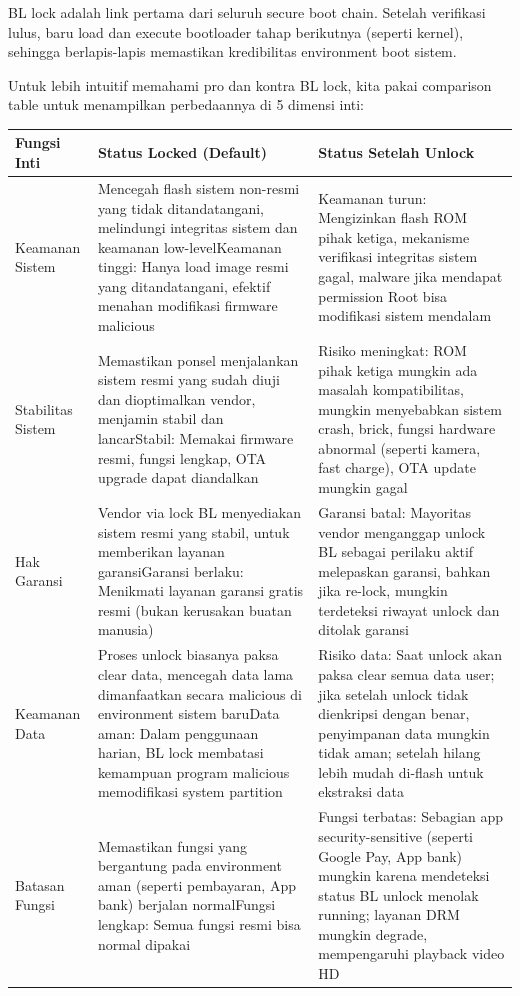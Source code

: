 
BL lock adalah link pertama dari seluruh secure boot chain. Setelah verifikasi lulus, baru load dan execute bootloader tahap berikutnya (seperti kernel), sehingga berlapis-lapis memastikan kredibilitas environment boot sistem.


Untuk lebih intuitif memahami pro dan kontra BL lock, kita pakai comparison table untuk menampilkan perbedaannya di 5 dimensi inti:

\begin{center}
\begin{tabularx}{\linewidth}{|X|X|X|}
\hline
\textbf{Fungsi Inti} & \textbf{Status Locked (Default)} & \textbf{Status Setelah Unlock} \tabularnewline
\hline
Keamanan Sistem & Mencegah flash sistem non-resmi yang tidak ditandatangani, melindungi integritas sistem dan keamanan low-level\newline Keamanan tinggi: Hanya load image resmi yang ditandatangani, efektif menahan modifikasi firmware malicious & Keamanan turun: Mengizinkan flash ROM pihak ketiga, mekanisme verifikasi integritas sistem gagal, malware jika mendapat permission Root bisa modifikasi sistem mendalam \tabularnewline
Stabilitas Sistem & Memastikan ponsel menjalankan sistem resmi yang sudah diuji dan dioptimalkan vendor, menjamin stabil dan lancar\newline Stabil: Memakai firmware resmi, fungsi lengkap, OTA upgrade dapat diandalkan & Risiko meningkat: ROM pihak ketiga mungkin ada masalah kompatibilitas, mungkin menyebabkan sistem crash, brick, fungsi hardware abnormal (seperti kamera, fast charge), OTA update mungkin gagal \tabularnewline
Hak Garansi & Vendor via lock BL menyediakan sistem resmi yang stabil, untuk memberikan layanan garansi\newline Garansi berlaku: Menikmati layanan garansi gratis resmi (bukan kerusakan buatan manusia) & Garansi batal: Mayoritas vendor menganggap unlock BL sebagai perilaku aktif melepaskan garansi, bahkan jika re-lock, mungkin terdeteksi riwayat unlock dan ditolak garansi \tabularnewline
Keamanan Data & Proses unlock biasanya paksa clear data, mencegah data lama dimanfaatkan secara malicious di environment sistem baru\newline Data aman: Dalam penggunaan harian, BL lock membatasi kemampuan program malicious memodifikasi system partition & Risiko data: Saat unlock akan paksa clear semua data user; jika setelah unlock tidak dienkripsi dengan benar, penyimpanan data mungkin tidak aman; setelah hilang lebih mudah di-flash untuk ekstraksi data \tabularnewline
Batasan Fungsi & Memastikan fungsi yang bergantung pada environment aman (seperti pembayaran, App bank) berjalan normal\newline Fungsi lengkap: Semua fungsi resmi bisa normal dipakai & Fungsi terbatas: Sebagian app security-sensitive (seperti Google Pay, App bank) mungkin karena mendeteksi status BL unlock menolak running; layanan DRM mungkin degrade, mempengaruhi playback video HD \tabularnewline
\hline
\end{tabularx}
\end{center}


